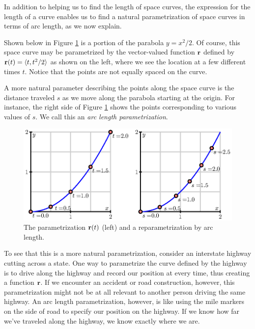 In addition to helping us to find the length of space curves, the
expression for the length of a curve enables us to find a natural
parametrization of space curves in terms of arc length, as we now
explain. 

Shown below in Figure \ref{F.9.8.parametrization} is a portion of the
parabola $y = x^2/2$.  Of course, this space curve may be parametrized by 
the vector-valued function $\mathbf{r}$ defined by $\mathbf{r}(t) = \langle t, t^2/2\rangle$ as shown
on the left, where we see the location at a few different times $t$.
Notice that the points are not equally spaced on the curve.

A more natural parameter describing the points along the space curve
is the distance traveled $s$ as we move along the parabola starting at
the origin.  For instance, the right side of Figure
\ref{F.9.8.parametrization} shows the points corresponding to various
values of $s$.  We call this an {\em arc length parametrization}.

\begin{figure}[ht]
  \begin{center}
    \includegraphics{figures/fig_9_8_param.eps}
    \caption{The parametrization $\mathbf{r}(t)$ (left) and a
      reparametrization by arc length.}
    \label{F.9.8.parametrization}
  \end{center}
\end{figure}

To see that this is a more natural parametrization, consider an
interstate highway cutting across a state.  One way
to parametrize the curve defined by the highway is to drive along the
highway and record our position at every time, thus creating a
function $\mathbf{r}$.  If we encounter an accident or road construction,
however,
this parametrization might not be at all relevant to another person
driving the same highway.  An arc length parametrization, however, is
like using the mile markers on the side of road to specify our
position on the highway.  If we know how far we've traveled along the
highway, we know exactly where we are.

